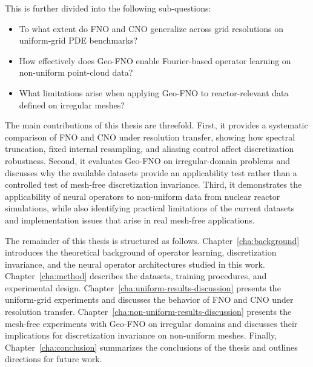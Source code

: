 This is further divided into the following sub-questions:

\begin{itemize}
    \item To what extent do FNO and CNO generalize across grid resolutions on uniform-grid PDE benchmarks?
    
    \item How effectively does Geo-FNO enable Fourier\hyp{}based operator learning on non\hyp{}uniform point\hyp{}cloud data?
    
    \item What limitations arise when applying Geo-FNO to reactor-relevant data defined on irregular meshes?
\end{itemize}

The main contributions of this thesis are threefold. First, it provides a systematic comparison of FNO and CNO under resolution transfer, showing how spectral truncation, fixed internal resampling, and aliasing control affect discretization robustness. Second, it evaluates Geo-FNO on irregular-domain problems and discusses why the available datasets provide an applicability test rather than a controlled test of mesh-free discretization invariance. Third, it demonstrates the applicability of neural operators to non-uniform data from nuclear reactor simulations, while also identifying practical limitations of the current datasets and implementation issues that arise in real mesh-free applications.

The remainder of this thesis is structured as follows. Chapter~\ref{cha:background} introduces the theoretical background of operator learning, discretization invariance, and the neural operator architectures studied in this work. Chapter~\ref{cha:method} describes the datasets, training procedures, and experimental design. Chapter~\ref{cha:uniform-results-discussion} presents the uniform-grid experiments and discusses the behavior of FNO and CNO under resolution transfer. Chapter~\ref{cha:non-uniform-results-discussion} presents the mesh-free experiments with Geo-FNO on irregular domains and discusses their implications for discretization invariance on non-uniform meshes. Finally, Chapter~\ref{cha:conclusion} summarizes the conclusions of the thesis and outlines directions for future work.
